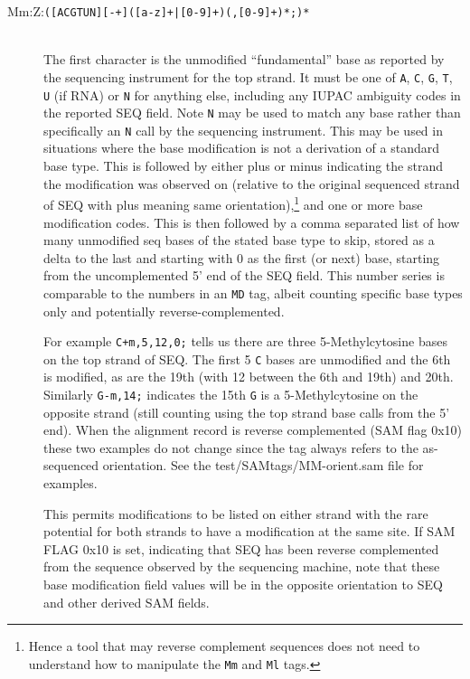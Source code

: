 \documentclass[10pt]{article}
\newcommand{\tagregex}[1]{{\tt #1}}
\begin{document}
\begin{description}
\item[Mm:Z:\tagregex{([ACGTUN][-+]([a-z]+|[0-9]+)(,[0-9]+)*;)*}]
\hfill\\
The first character is the unmodified ``fundamental'' base as reported
by the sequencing instrument for the top strand.
It must be one of {\tt A}, {\tt C}, {\tt G}, {\tt T}, {\tt U} (if RNA) or {\tt N} for anything else, including any IUPAC ambiguity codes in the reported SEQ field.
Note {\tt N} may be used to match any base rather than specifically an {\tt N} call by the sequencing instrument.
This may be used in situations where the base modification is not a derivation of a standard base type.
This is followed by either plus or minus indicating the strand the modification was observed on (relative to the original sequenced strand of {\sf SEQ} with plus meaning same orientation),\footnote{Hence a tool that may reverse complement sequences does not need to understand how to manipulate the {\tt Mm} and {\tt Ml} tags.} and one or more base modification codes.
This is then followed by a comma separated list of how many unmodified seq bases of the stated base type to skip, stored as a delta to the last and starting with 0 as the first (or next) base, starting from the uncomplemented 5' end of the {\sf SEQ} field.
This number series is comparable to the numbers in an {\tt MD} tag,
albeit counting specific base types only and potentially reverse-complemented.

For example {\tt C+m,5,12,0;} tells us there are three
5-Methylcytosine bases on the top strand of {\sf SEQ}.
The first 5 {\tt C} bases are unmodified and the 6th is modified, as are the 19th (with 12 between the 6th and 19th) and 20th.
Similarly {\tt G-m,14;} indicates the 15th {\tt G} is a 5-Methylcytosine on the opposite strand (still counting using the top strand base calls from the 5' end).
When the alignment record is reverse complemented (SAM flag 0x10) these two examples do not change since the tag always refers to the as-sequenced orientation.
See the test/SAMtags/MM-orient.sam file for examples.

This permits modifications to be listed on either strand with the rare potential for both strands to have a modification at the same site.
If SAM FLAG 0x10 is set, indicating that SEQ has been reverse complemented from the sequence observed by the sequencing machine, note that these base modification field values will be in the opposite orientation to SEQ and other derived SAM fields.


\end{description}
\end{document}
